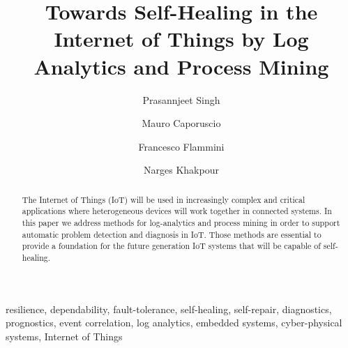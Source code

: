 \documentclass[a4paper,10pt,3p,twocolumn]{elsarticle}
\begin{document}
	
	
	
	\begin{frontmatter}
		
		\title{Towards Self-Healing in the Internet of Things by Log Analytics and Process Mining}
		
		\author[1]{Prasannjeet Singh}
		\author[1]{Mauro Caporuscio}
		\author[1]{Francesco Flammini}
		\author[1]{Narges Khakpour}
		
		\address[1]{Linnaeus University, Sweden}
		
		\begin{abstract}
			The Internet of Things (IoT) will be used in increasingly complex and critical applications where heterogeneous devices will work together in connected systems. In this paper we address methods for log-analytics and process mining in order to support automatic problem detection and diagnosis in IoT. Those methods are essential to provide a foundation for the future generation IoT systems that will be capable of self-healing.
		\end{abstract}
		
		\begin{keyword}
			resilience, dependability, fault-tolerance, self-healing, self-repair, diagnostics, prognostics, event correlation, log analytics, embedded systems, cyber-physical systems, Internet of Things
		\end{keyword}
		
	\end{frontmatter}
	
	
	
	
	
	\setmainfont[
	BoldFont={Charter Bold}, 
	ItalicFont={Charter Italic},
	]{Charter}
	
\end{document}
